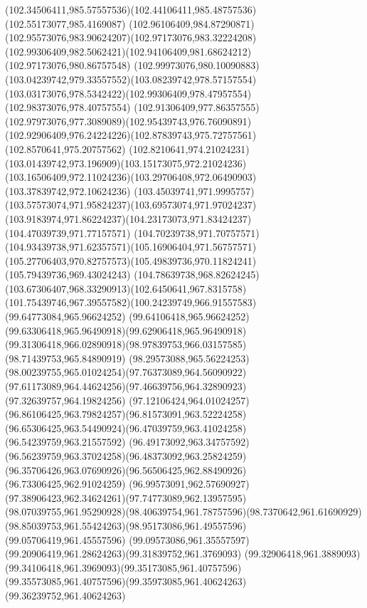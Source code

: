 {    \curveto(102.34506411,985.57557536)(102.44106411,985.48757536)(102.55173077,985.4169087)
    \curveto(102.96106409,984.87290871)(102.95573076,983.90624207)(102.97173076,983.32224208)
    \curveto(102.99306409,982.5062421)(102.94106409,981.68624212)(102.97173076,980.86757548)
    \curveto(102.99973076,980.10090883)(103.04239742,979.33557552)(103.08239742,978.57157554)
    \curveto(103.03173076,978.5342422)(102.99306409,978.47957554)(102.98373076,978.40757554)
    \curveto(102.91306409,977.86357555)(102.97973076,977.3089089)(102.95439743,976.76090891)
    \curveto(102.92906409,976.24224226)(102.87839743,975.72757561)(102.8570641,975.20757562)
    \curveto(102.8210641,974.21024231)(103.01439742,973.196909)(103.15173075,972.21024236)
    \curveto(103.16506409,972.11024236)(103.29706408,972.06490903)(103.37839742,972.10624236)
    \curveto(103.45039741,971.9995757)(103.57573074,971.95824237)(103.69573074,971.97024237)
    \curveto(103.9183974,971.86224237)(104.23173073,971.83424237)(104.47039739,971.77157571)
    \curveto(104.70239738,971.70757571)(104.93439738,971.62357571)(105.16906404,971.56757571)
    \curveto(105.27706403,970.82757573)(105.49839736,970.11824241)(105.79439736,969.43024243)
    \curveto(104.78639738,968.82624245)(103.67306407,968.33290913)(102.6450641,967.8315758)
    \curveto(101.75439746,967.39557582)(100.24239749,966.91557583)(99.64773084,965.96624252)
    \curveto(99.64106418,965.96624252)(99.63306418,965.96490918)(99.62906418,965.96490918)
    \curveto(99.31306418,966.02890918)(98.97839753,966.03157585)(98.71439753,965.84890919)
    \curveto(98.29573088,965.56224253)(98.00239755,965.01024254)(97.76373089,964.56090922)
    \curveto(97.61173089,964.44624256)(97.46639756,964.32890923)(97.32639757,964.19824256)
    \curveto(97.12106424,964.01024257)(96.86106425,963.79824257)(96.81573091,963.52224258)
    \curveto(96.65306425,963.54490924)(96.47039759,963.41024258)(96.54239759,963.21557592)
    \curveto(96.49173092,963.34757592)(96.56239759,963.37024258)(96.48373092,963.25824259)
    \curveto(96.35706426,963.07690926)(96.56506425,962.88490926)(96.73306425,962.91024259)
    \curveto(96.99573091,962.57690927)(97.38906423,962.34624261)(97.74773089,962.13957595)
    \curveto(98.07039755,961.95290928)(98.40639754,961.78757596)(98.7370642,961.61690929)
    \curveto(98.85039753,961.55424263)(98.95173086,961.49557596)(99.05706419,961.45557596)
    \curveto(99.09573086,961.35557597)(99.20906419,961.28624263)(99.31839752,961.3769093)
    \curveto(99.32906418,961.3889093)(99.34106418,961.3969093)(99.35173085,961.40757596)
    \curveto(99.35573085,961.40757596)(99.35973085,961.40624263)(99.36239752,961.40624263)
}
